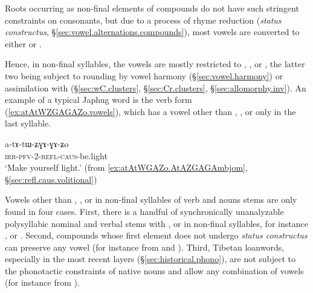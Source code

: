 Roots occurring as non-final elements of compounds do not have such stringent constraints on consonants, but due to a process of rhyme reduction (\textit{status constructus}, §\ref{sec:vowel.alternations.compounds}), most vowels are converted to either  or .

Hence, in non-final syllables, the vowels are mostly restricted to , , or , the latter two being subject to rounding by vowel harmony (§\ref{sec:vowel.harmony}) or assimilation with  (§\ref{sec:wC.clusters}, §\ref{sec:Cr.clusters}, §\ref{sec:allomorphy.inv}). An example of a typical Japhug word is the verb form  (\ref{ex:atAtWZGAGAZo.vowels}), which has a vowel other than , , or  only in the last syllable.

\begin{exe}
	\ex \label{ex:atAtWZGAGAZo.vowels}
	\gll a-tɤ-tɯ-ʑɣɤ-ɣɤ-ʑo \\
	\textsc{irr}-\textsc{pfv}-2-\textsc{refl}-\textsc{caus}-be.light \\
	\glt `Make yourself light.' (from \ref{ex:atAtWGAZo.AtAZGAGAmbjom}, §\ref{sec:refl.caus.volitional})
\end{exe}


Vowels other than , , or  in non-final syllables of verb and nouns stems are only found in four cases. First, there is a handful of synchronically unanalyzable polysyllabic nominal and verbal stems with ,  or  in non-final syllables, for instance ,  or . Second, compounds whose first element does not undergo \textit{status constructus} can preserve any vowel (for instance  from  and ). Third,  Tibetan loanwords, especially in the most recent layers (§\ref{sec:historical.phono}), are not subject to the phonotactic constraints of native nouns and allow any combination of vowels (for instance  from ).

